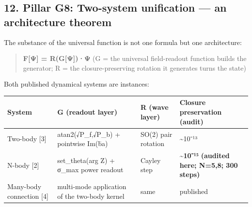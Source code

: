 \documentclass[
]{article}
\newcounter{none} %
\begin{document}
\subsection{12. Pillar G8: Two-system unification --- an architecture
theorem}\label{pillar-g8-two-system-unification-an-architecture-theorem}

The substance of the universal function is not one formula but one
architecture:

\begin{quote}
\textbf{F{[}Ψ{]} = R(G{[}Ψ{]})·Ψ} (G = the universal field-readout
function builds the generator; R = the closure-preserving rotation it
generates turns the state)
\end{quote}

Both published dynamical systems are instances:

{\def\LTcaptype{none} %
\begin{longtable}[]{@{}
  >{\raggedright\arraybackslash}p{}
  >{\raggedright\arraybackslash}p{}
  >{\raggedright\arraybackslash}p{}
  >{\raggedright\arraybackslash}p{}@{}}
\toprule\noalign{}
\begin{minipage}[b]{\linewidth}\raggedright
System
\end{minipage} & \begin{minipage}[b]{\linewidth}\raggedright
G (readout layer)
\end{minipage} & \begin{minipage}[b]{\linewidth}\raggedright
R (wave layer)
\end{minipage} & \begin{minipage}[b]{\linewidth}\raggedright
Closure preservation (audit)
\end{minipage} \\
\midrule\noalign{}
\endhead
\bottomrule\noalign{}
\endlastfoot
Two-body {[}3{]} & atan2(√P\_f,√P\_b) + pointwise Im(b̄a) & SO(2) pair
rotation & \textasciitilde10⁻¹³ \\
N-body {[}2{]} & set\_theta(arg Z) + σ\_max power readout & Cayley step
& \textbf{\textasciitilde10⁻¹⁵ (audited here; N=5,8; 300 steps)} \\
Many-body connection {[}4{]} & multi-mode application of the two-body
kernel & same & published \\
\end{longtable}
}
\end{document}
